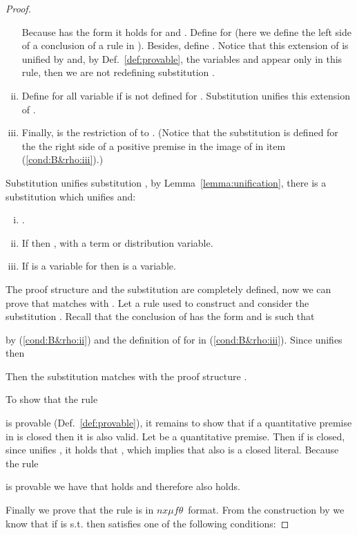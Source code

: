 \documentclass[submission,copyright,creativecommons]{eptcs}
\newcommand{\nxmuft}{\ensuremath{\textit{nx}\mu\textit{f}\theta}}
\begin{document}
\begin{proof}
\begin{enumerate}[(i)]
 Because  has the form  
 it holds  for  and 
 .
Define  for 
 (here we define the left side of a conclusion of a rule in ).   
Besides, define .
Notice that this extension of  is unified by  and, 
 by Def.~\ref{def:provable}, the variables  and  
 appear only in this rule, then we are not redefining substitution .
\item Define  for all variable 
 if  is not defined for . 
 Substitution  unifies this extension of .
\item Finally,  is the restriction of  to .  
(Notice that the substitution  is defined for the the right side 
of a positive premise in the image of  in item (\ref{cond:B&rho:iii}).)


\end{enumerate}

Substitution  unifies substitution , by Lemma~\ref{lemma:unification},
there is a substitution  which unifies  and:
\begin{enumerate}[(i)]
 \item \label{unification:i} 
 .
 \item \label{unification:ii}
 If  then , with   a term or distribution variable.
\item \label{unification:iii} 
 If  is a variable for  then  is a variable. 
\end{enumerate}
 
The proof structure   and the substitution  are completely defined,
now we can prove that  matches with . 
Let  a rule used to construct  and consider the substitution .
Recall that the conclusion of  has the form
 and
 is such that 
 
by (\ref{cond:B&rho:ii}) and the definition of  for  in 
(\ref{cond:B&rho:iii}). 
Since  unifies  then 

Then the substitution  matches with the proof structure .

To show that the rule 

is provable (Def.~\ref{def:provable}), it remains to show that if a quantitative premise 
in  is closed then it is also valid.
Let  be a quantitative premise. 
 Then if   is closed, since  unifies , it holds that
,
which implies that also  is a closed literal. 
 Because the rule 
 
 is provable we have that  holds and therefore also  holds.


Finally we prove that the rule  is in \nxmuft\ format. 
From the construction by  we know that if  is
s.t.  then  satisfies one of the following conditions:


\end{proof}
\end{document}
